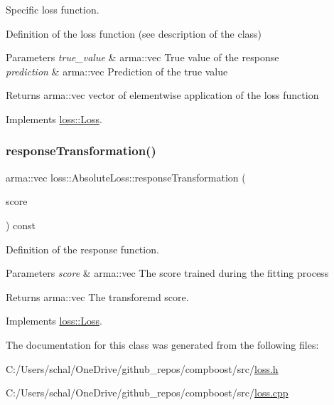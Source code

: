 Specific loss function. 

Definition of the loss function (see description of the class)


\begin{DoxyParams}{Parameters}
{\em true\+\_\+value} & {\ttfamily arma\+::vec} True value of the response \\
\hline
{\em prediction} & {\ttfamily arma\+::vec} Prediction of the true value\\
\hline
\end{DoxyParams}
\begin{DoxyReturn}{Returns}
{\ttfamily arma\+::vec} vector of elementwise application of the loss function 
\end{DoxyReturn}


Implements \mbox{\hyperlink{classloss_1_1_loss_ae9f94dd9b8311397583ba3a9cb485e94}{loss\+::\+Loss}}.

\mbox{\label{classloss_1_1_absolute_loss_aa7e0ac902d905ae97f9e2d0337c6c058}} 
\subsubsection{\texorpdfstring{response\+Transformation()}{responseTransformation()}}
{\footnotesize\ttfamily arma\+::vec loss\+::\+Absolute\+Loss\+::response\+Transformation (\begin{DoxyParamCaption}\item[{const arma\+::vec \&}]{score }\end{DoxyParamCaption}) const\hspace{0.3cm}{\ttfamily [virtual]}}



Definition of the response function. 


\begin{DoxyParams}{Parameters}
{\em score} & {\ttfamily arma\+::vec} The score trained during the fitting process\\
\hline
\end{DoxyParams}
\begin{DoxyReturn}{Returns}
{\ttfamily arma\+::vec} The transforemd score. 
\end{DoxyReturn}


Implements \mbox{\hyperlink{classloss_1_1_loss_a0a84b7df79b08e40b538aaa7e6ee75c4}{loss\+::\+Loss}}.



The documentation for this class was generated from the following files\+:\begin{DoxyCompactItemize}
\item 
C\+:/\+Users/schal/\+One\+Drive/github\+\_\+repos/compboost/src/\mbox{\hyperlink{loss_8h}{loss.\+h}}\item 
C\+:/\+Users/schal/\+One\+Drive/github\+\_\+repos/compboost/src/\mbox{\hyperlink{loss_8cpp}{loss.\+cpp}}\end{DoxyCompactItemize}
